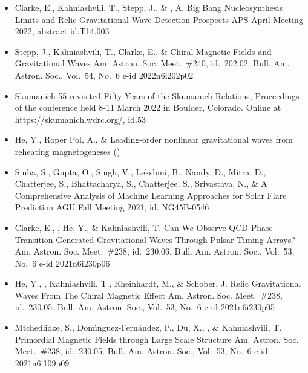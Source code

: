 \begin{itemize}
\item[{70.}~]
Clarke, E., Kahniashvili, T., Stepp, J., \& \Brandenburg, A.
{Big Bang Nucleosynthesis Limits and Relic Gravitational Wave Detection Prospects}
{APS April Meeting 2022, abstract id.T14.003}

\item[{69.}~]
Stepp, J., Kahniashvili, T., Clarke, E., \& \Brandenburg{}
{Chiral Magnetic Fields and Gravitational Waves}
{Am. Astron. Soc. Meet.~\#240, id.~202.02. Bull. Am. Astron. Soc., Vol.~54, No.~6 e-id 2022n6i202p02}

\item[{68.}~]
\Brandenburg{}
{Skumanich-55 revisited}
{Fifty Years of the Skumanich Relations, Proceedings of the conference held 8-11 March 2022 in Boulder, Colorado. Online at https://skumanich.wdrc.org/, id.53}

\item[{67.}~]
He, Y., Roper Pol, A., \& \Brandenburg{}
{Leading-order nonlinear gravitational waves from reheating magnetogeneses}
()

\item[{66.}~]
Sinha, S., Gupta, O., Singh, V., Lekshmi, B., Nandy, D., Mitra, D., Chatterjee, S., Bhattacharya, S., Chatterjee, S., Srivastava, N., \& \Brandenburg{}
{A Comprehensive Analysis of Machine Learning Approaches for Solar Flare Prediction}
{AGU Fall Meeting 2021, id. NG45B-0546}

\item[{65.}~]
Clarke, E., \Brandenburg, He, Y., \& Kahniashvili, T.
{Can We Observe QCD Phase Transition-Generated Gravitational Waves Through Pulsar Timing Arrays?}
{Am. Astron. Soc. Meet.~\#238, id.~230.06. Bull. Am. Astron. Soc., Vol.~53, No.~6 e-id 2021n6i230p06}

\item[{64.}~]
He, Y., \Brandenburg, Kahniashvili, T., Rheinhardt, M., \& Schober, J.
{Relic Gravitational Waves From The Chiral Magnetic Effect}
{Am. Astron. Soc. Meet.~\#238, id.~230.05. Bull. Am. Astron. Soc., Vol.~53, No.~6 e-id 2021n6i230p05}

\item[{63.}~]
Mtchedlidze, S., Dom{\'\i}nguez-Fern{\'a}ndez, P., Du, X., \Brandenburg, \& Kahniashvili, T.
{Primordial Magnetic Fields through Large Scale Structure}
{Am. Astron. Soc. Meet.~\#238, id.~230.05. Bull. Am. Astron. Soc., Vol.~53, No.~6 e-id 2021n6i109p09}


\end{itemize}
